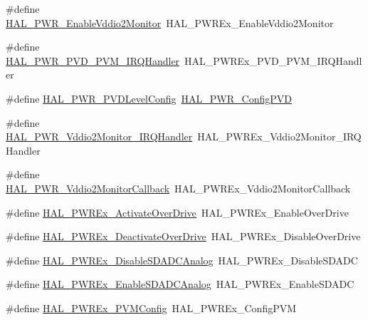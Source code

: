 \begin{DoxyCompactItemize}
\item 
\#define \hyperlink{group___h_a_l___p_w_r___aliased_ga24b58c5b242fb37cb1281dbe38f11cf9}{H\+A\+L\+\_\+\+P\+W\+R\+\_\+\+Enable\+Vddio2\+Monitor}~H\+A\+L\+\_\+\+P\+W\+R\+Ex\+\_\+\+Enable\+Vddio2\+Monitor
\item 
\#define \hyperlink{group___h_a_l___p_w_r___aliased_gaef372c1750d486fcb3bf8246988fd9ae}{H\+A\+L\+\_\+\+P\+W\+R\+\_\+\+P\+V\+D\+\_\+\+P\+V\+M\+\_\+\+I\+R\+Q\+Handler}~H\+A\+L\+\_\+\+P\+W\+R\+Ex\+\_\+\+P\+V\+D\+\_\+\+P\+V\+M\+\_\+\+I\+R\+Q\+Handler
\item 
\#define \hyperlink{group___h_a_l___p_w_r___aliased_ga68e7b6a7061c08f98dcdf40cd9292daa}{H\+A\+L\+\_\+\+P\+W\+R\+\_\+\+P\+V\+D\+Level\+Config}~\hyperlink{group___p_w_r___exported___functions___group2_ga87e59191de350b0942847624ddbe6d9d}{H\+A\+L\+\_\+\+P\+W\+R\+\_\+\+Config\+P\+VD}
\item 
\#define \hyperlink{group___h_a_l___p_w_r___aliased_ga45060736b4f7dceef206a35ef5dd6fe8}{H\+A\+L\+\_\+\+P\+W\+R\+\_\+\+Vddio2\+Monitor\+\_\+\+I\+R\+Q\+Handler}~H\+A\+L\+\_\+\+P\+W\+R\+Ex\+\_\+\+Vddio2\+Monitor\+\_\+\+I\+R\+Q\+Handler
\item 
\#define \hyperlink{group___h_a_l___p_w_r___aliased_ga94a9526151bf5196900a49d7a29971df}{H\+A\+L\+\_\+\+P\+W\+R\+\_\+\+Vddio2\+Monitor\+Callback}~H\+A\+L\+\_\+\+P\+W\+R\+Ex\+\_\+\+Vddio2\+Monitor\+Callback
\item 
\#define \hyperlink{group___h_a_l___p_w_r___aliased_ga7e8045466ad70adfb92b0d2ee2e9f8e0}{H\+A\+L\+\_\+\+P\+W\+R\+Ex\+\_\+\+Activate\+Over\+Drive}~H\+A\+L\+\_\+\+P\+W\+R\+Ex\+\_\+\+Enable\+Over\+Drive
\item 
\#define \hyperlink{group___h_a_l___p_w_r___aliased_ga89286748f454d55aa96fd55eb09b647c}{H\+A\+L\+\_\+\+P\+W\+R\+Ex\+\_\+\+Deactivate\+Over\+Drive}~H\+A\+L\+\_\+\+P\+W\+R\+Ex\+\_\+\+Disable\+Over\+Drive
\item 
\#define \hyperlink{group___h_a_l___p_w_r___aliased_ga12c8593c0f54dd87bd780fa3f2f64e3d}{H\+A\+L\+\_\+\+P\+W\+R\+Ex\+\_\+\+Disable\+S\+D\+A\+D\+C\+Analog}~H\+A\+L\+\_\+\+P\+W\+R\+Ex\+\_\+\+Disable\+S\+D\+A\+DC
\item 
\#define \hyperlink{group___h_a_l___p_w_r___aliased_ga6d03ec69c2f6072e818420aa4135e7d3}{H\+A\+L\+\_\+\+P\+W\+R\+Ex\+\_\+\+Enable\+S\+D\+A\+D\+C\+Analog}~H\+A\+L\+\_\+\+P\+W\+R\+Ex\+\_\+\+Enable\+S\+D\+A\+DC
\item 
\#define \hyperlink{group___h_a_l___p_w_r___aliased_gacff48681bbdda3059a2e161b6a3b33c3}{H\+A\+L\+\_\+\+P\+W\+R\+Ex\+\_\+\+P\+V\+M\+Config}~H\+A\+L\+\_\+\+P\+W\+R\+Ex\+\_\+\+Config\+P\+VM

\end{DoxyCompactItemize}
